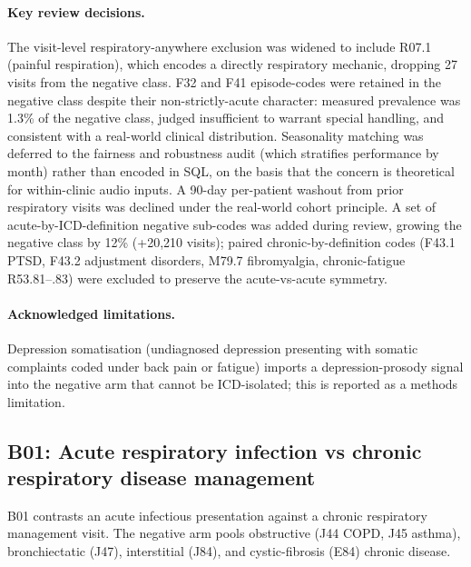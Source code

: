 \documentclass[utf8]{frontiers_suppmat} %
\begin{document}
\paragraph{Key review decisions.} The visit-level respiratory-anywhere
exclusion was widened to include R07.1 (painful respiration), which
encodes a directly respiratory mechanic, dropping 27 visits from the
negative class. F32 and F41 episode-codes were retained in the
negative class despite their non-strictly-acute character: measured
prevalence was 1.3\% of the negative class, judged insufficient to
warrant special handling, and consistent with a real-world clinical
distribution. Seasonality matching was deferred to the fairness and
robustness audit (which stratifies performance by month) rather than
encoded in SQL, on the basis that the concern is theoretical for
within-clinic audio inputs. A 90-day per-patient washout from prior
respiratory visits was declined under the real-world cohort principle.
A set of acute-by-ICD-definition negative sub-codes was added during
review, growing the negative class by 12\% (+20{,}210 visits); paired
chronic-by-definition codes (F43.1 PTSD, F43.2 adjustment disorders,
M79.7 fibromyalgia, chronic-fatigue R53.81--.83) were excluded to
preserve the acute-vs-acute symmetry.

\paragraph{Acknowledged limitations.} Depression somatisation
(undiagnosed depression presenting with somatic complaints coded
under back pain or fatigue) imports a depression-prosody signal into
the negative arm that cannot be ICD-isolated; this is reported as a
methods limitation.

\subsection{B01: Acute respiratory infection vs chronic respiratory disease management}
\label{sec:supp-b01}

B01 contrasts an acute infectious presentation against a chronic
respiratory management visit. The negative arm pools obstructive
(J44 COPD, J45 asthma), bronchiectatic (J47), interstitial (J84),
and cystic-fibrosis (E84) chronic disease.
\end{document}
